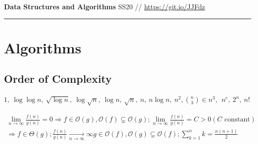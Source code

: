 \documentclass[9pt,landscape,a4paper, table]{extarticle}
\begin{document}
\begin{multicols*}{3}
\raggedright

\large{\textbf{Data Structures and Algorithms} SS20} // %
\url{https://git.io/JJFdz}

\hrule

\setlength{\parindent}{0pt}
\setlength{\parskip}{1pt}
\setlength{\abovedisplayskip}{0pt}
\setlength{\belowdisplayskip}{0pt}
\setlength{\abovedisplayshortskip}{0pt}
\setlength{\belowdisplayshortskip}{0pt}


\section{Algorithms}

\subsection{Order of Complexity}
\begin{center}
{\footnotesize
$1,\ \log\log n,\ \sqrt{\log n},\ \log\sqrt{n},\ \log n,\ \sqrt{n},\ n,\ n\log n,\ n^2,\binom{n}{3} \in n^3,\ \ n^c,\  2^n,\ n!$
}
\end{center}
{\footnotesize
\begin{align*}
    \lim _{n\rightarrow\infty}\frac{f(n)}{g(n)} = 0 \Rightarrow f \in \mathcal{O}(g), \mathcal{O}(f) \subsetneq \mathcal{O}(g); \lim _{n\rightarrow\infty}\frac{f(n)}{g(n)} = C > 0 (C \text{ constant}) \\ \Rightarrow f \in \Theta (g); \frac{f(n)}{g(n)} \underset{n\rightarrow\infty}{\rightarrow} \infty g \in \mathcal{O}(f), \mathcal{O}(g) \subsetneq \mathcal{O}(f);
    \sum_{k=1}^n k = \frac{n(n+1)}{2}
\end{align*}}

\end{multicols*}
\end{document}
